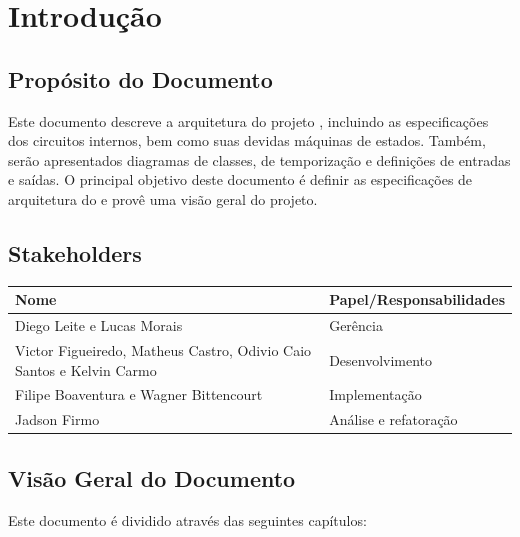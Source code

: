 \documentclass{report}
\begin{document}
\chapter{Introdução}
  
  \section{Propósito do Documento}
  Este documento descreve a arquitetura do projeto \ipPROCESSProject, incluindo as especificações dos circuitos internos, bem como suas devidas máquinas de estados. Também, serão apresentados diagramas de classes, de temporização e definições de entradas e saídas. O principal objetivo deste documento é definir as especificações de arquitetura do \ipPROCESSProject \space e provê uma visão geral do projeto.
  
  \section{Stakeholders}
    \FloatBarrier
    \begin{table}[H] 
      \begin{center}
        \begin{tabular}[pos]{|m{6cm} | m{8cm}|} 
          \hline 
          \cellcolor[gray]{0.9}\textbf{Nome} & \cellcolor[gray]{0.9}\textbf{Papel/Responsabilidades} \\ \hline
           Diego Leite e Lucas Morais & Gerência  \\ \hline
           Victor Figueiredo, Matheus Castro, Odivio Caio Santos e Kelvin Carmo & Desenvolvimento  \\ \hline
           Filipe Boaventura e Wagner Bittencourt & Implementação  \\ \hline
           Jadson Firmo & Análise e refatoração  \\ \hline
        \end{tabular}
      \end{center}
    \end{table} 

\section{Visão Geral do Documento}

Este documento é dividido através das seguintes capítulos:
\end{document}
